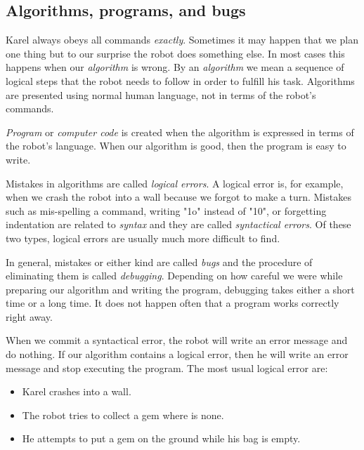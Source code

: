 \subsection{Algorithms, programs, and bugs} \label{subsec:interm1}

Karel always obeys all commands {\em exactly}. Sometimes it may happen that 
we plan one thing but to our surprise the robot does something else. In most cases this 
happens when our {\em algorithm} is wrong. By an {\em algorithm} we mean a sequence of 
logical steps that the robot needs to follow in order to fulfill his task. Algorithms 
are presented using normal human language, not in terms of the robot's commands. 

{\em Program} or {\em computer code} is created when the algorithm is expressed
in terms of the robot's language. When our algorithm is good, then 
the program is easy to write.

Mistakes in algorithms are called {\em logical errors}. A logical error is, for 
example, when we crash the robot into a wall because we forgot to make a turn.
Mistakes such as mis-spelling a command, writing "1o" instead of "10", or forgetting 
indentation are related to 
{\em syntax} and they are called {\em syntactical errors}. Of these two types, 
logical errors are usually much more difficult to find. 

In general, mistakes or either kind are called {\em bugs} and the procedure of 
eliminating them is called {\em debugging}. Depending on how careful we 
were while preparing our algorithm and writing the program, debugging takes either 
a short time or a long time. It does not happen often that a program works correctly
right away. 

When we commit a syntactical error,
the robot will write an error message and do nothing.
If our algorithm contains a logical error, then he will
write an error message and stop executing the program. 
The most usual logical error are:

\begin{itemize}
\item Karel crashes into a wall.
\item The robot tries to collect a gem where is none.
\item He attempts to put a gem on the ground while his bag is empty.
\end{itemize}


